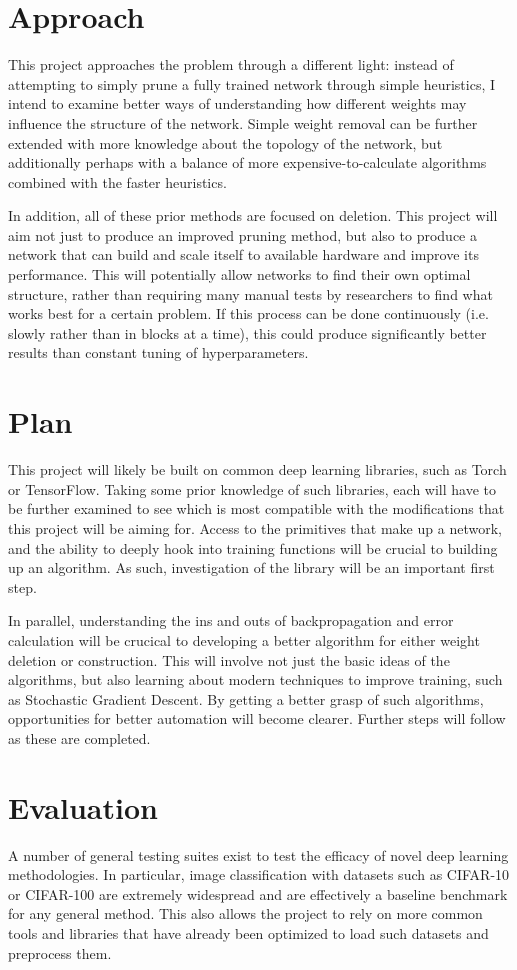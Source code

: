 \documentclass[11pt]{article}
\begin{document}
\section*{Approach}
  This project approaches the problem through a different light: instead of attempting to simply prune a fully trained network through simple heuristics, I intend to examine better ways of understanding how different weights may influence the structure of the network.
  Simple weight removal can be further extended with more knowledge about the topology of the network, but additionally perhaps with a balance of more expensive-to-calculate algorithms combined with the faster heuristics.

  In addition, all of these prior methods are focused on deletion.
  This project will aim not just to produce an improved pruning method, but also to produce a network that can build and scale itself to available hardware and improve its performance.
  This will potentially allow networks to find their own optimal structure, rather than requiring many manual tests by researchers to find what works best for a certain problem.
  If this process can be done continuously (i.e. slowly rather than in blocks at a time), this could produce significantly better results than constant tuning of hyperparameters.
\section*{Plan}
  This project will likely be built on common deep learning libraries, such as Torch or TensorFlow.
  Taking some prior knowledge of such libraries, each will have to be further examined to see which is most compatible with the modifications that this project will be aiming for.
  Access to the primitives that make up a network, and the ability to deeply hook into training functions will be crucial to building up an algorithm.
  As such, investigation of the library will be an important first step.

  In parallel, understanding the ins and outs of backpropagation and error calculation will be crucical to developing a better algorithm for either weight deletion or construction.
  This will involve not just the basic ideas of the algorithms, but also learning about modern techniques to improve training, such as Stochastic Gradient Descent. 
  By getting a better grasp of such algorithms, opportunities for better automation will become clearer.
  Further steps will follow as these are completed.
\section*{Evaluation}
  A number of general testing suites exist to test the efficacy of novel deep learning methodologies.
  In particular, image classification with datasets such as CIFAR-10 or CIFAR-100 are extremely widespread and are effectively a baseline benchmark for any general method.
  This also allows the project to rely on more common tools and libraries that have already been optimized to load such datasets and preprocess them.
\end{document}
